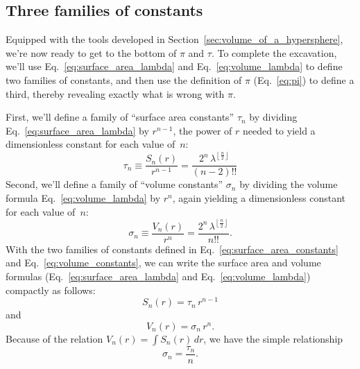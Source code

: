 


  \subsection{Three families of constants} %
  \label{sec:three_families_of_constants}

Equipped with the tools developed in Section~\ref{sec:volume_of_a_hypersphere}, we're now ready to get to the bottom of $\pi$ and $\tau$. To complete the excavation, we'll use Eq.~\eqref{eq:surface_area_lambda} and Eq.~\eqref{eq:volume_lambda} to define two families of constants, and then use the definition of $\pi$ (Eq.~\eqref{eq:pi}) to define a third, thereby revealing exactly what is wrong with $\pi$.

First, we'll define a family of ``surface area constants'' $\tau_n$ by dividing \linebreak Eq.~\eqref{eq:surface_area_lambda} by $r^{n-1}$, the power of $r$ needed to yield a dimensionless constant for each value of~$n$:
\begin{equation}
\label{eq:surface_area_constants}
\tau_n \equiv \frac{S_n(r)}{r^{n-1}} = \frac{2^n\,\lambda^{\left\lfloor \frac{n}{2} \right\rfloor}}{(n-2)!!}
\end{equation}
Second, we'll define a family of ``volume constants'' $\sigma_n$ by dividing the volume formula Eq.~\eqref{eq:volume_lambda} by $r^n$, again yielding a dimensionless constant for each value of~$n$:
\begin{equation}
\label{eq:volume_constants}
\sigma_n \equiv \frac{V_n(r)}{r^n} = \frac{2^n\,\lambda^{\left\lfloor \frac{n}{2} \right\rfloor}}{n!!}.
\end{equation}
With the two families of constants defined in Eq.~\eqref{eq:surface_area_constants} and Eq.~\eqref{eq:volume_constants}, we can write the surface area and volume formulas (Eq.~\eqref{eq:surface_area_lambda} and Eq.~\eqref{eq:volume_lambda}) compactly as follows:
\[ S_n(r) = \tau_n\,r^{n-1} \]
and
\[ V_n(r) = \sigma_n\,r^n. \]
Because of the relation $V_n(r) = \int S_n(r)\,dr$, we have the simple relationship
\[
\sigma_n = \frac{\tau_n}{n}.
\]

